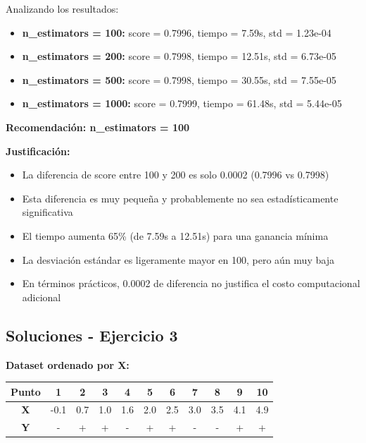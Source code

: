 \documentclass[12pt]{article}
\begin{document}
Analizando los resultados:

\begin{itemize}
    \item \textbf{n\_estimators = 100:} score = 0.7996, tiempo = 7.59s, std = 1.23e-04
    \item \textbf{n\_estimators = 200:} score = 0.7998, tiempo = 12.51s, std = 6.73e-05
    \item \textbf{n\_estimators = 500:} score = 0.7998, tiempo = 30.55s, std = 7.55e-05
    \item \textbf{n\_estimators = 1000:} score = 0.7999, tiempo = 61.48s, std = 5.44e-05
\end{itemize}

\textbf{Recomendación: n\_estimators = 100}

\vspace{1em}

\textbf{Justificación:}
\begin{itemize}
    \item La diferencia de score entre 100 y 200 es solo 0.0002 (0.7996 vs 0.7998)
    \item Esta diferencia es muy pequeña y probablemente no sea estadísticamente significativa
    \item El tiempo aumenta 65\% (de 7.59s a 12.51s) para una ganancia mínima
    \item La desviación estándar es ligeramente mayor en 100, pero aún muy baja
    \item En términos prácticos, 0.0002 de diferencia no justifica el costo computacional adicional
\end{itemize}

\subsection{Soluciones - Ejercicio 3}

\textbf{Dataset ordenado por X:}
\begin{table}[H]
    \centering
    \begin{tabular}{|c|c|c|c|c|c|c|c|c|c|c|}
        \hline
        \textbf{Punto} & 1 & 2 & 3 & 4 & 5 & 6 & 7 & 8 & 9 & 10 \\
        \hline
        \textbf{X} & -0.1 & 0.7 & 1.0 & 1.6 & 2.0 & 2.5 & 3.0 & 3.5 & 4.1 & 4.9 \\
        \hline
        \textbf{Y} & - & + & + & - & + & + & - & - & + & + \\
        \hline
    \end{tabular}
\end{table}
\end{document}

